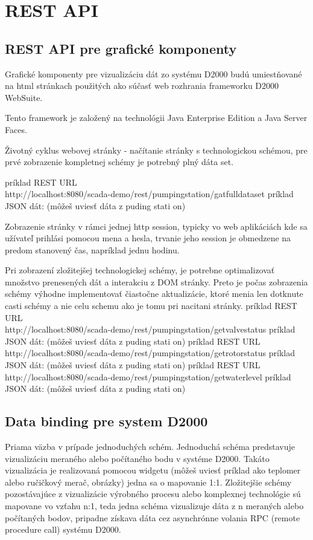 \chapter{REST API}

\section{REST API pre grafické komponenty}
Grafické komponenty pre vizualizáciu dát zo systému D2000 budú umiestňované na html stránkach použitých ako súčasť web rozhrania frameworku D2000 WebSuite.

Tento framework je založený na technológii Java Enterprise Edition a Java Server Faces.

Životný cyklus webovej stránky - načítanie stránky s technologickou schémou, pre prvé zobrazenie kompletnej schémy je potrebný plný dáta set.


príklad REST URL\\ http://localhost:8080/scada-demo/rest/pumpingstation/gatfulldataset
príklad JSON dát: (môžeš uviesť dáta z puding stati on)


Zobrazenie stránky v rámci jednej http session, typicky vo web aplikáciách kde sa užívateľ prihlási pomocou mena a hesla, trvanie jeho session je obmedzene na predom stanovený čas, napríklad jednu hodinu.


Pri zobrazení zložitejšej technologickej schémy, je potrebne optimalizovať množstvo prenesených dát a interakciu z DOM stránky. Preto je počas zobrazenia schémy výhodne implementovať čiastočne aktualizácie, ktoré menia len dotknute casti schémy a nie celu schemu ako je tomu pri nacitani stránky.  
príklad REST URL\\ http://localhost:8080/scada-demo/rest/pumpingstation/getvalvestatus
príklad JSON dát: (môžeš uviesť dáta z puding stati on)
príklad REST URL\\ http://localhost:8080/scada-demo/rest/pumpingstation/getrotorstatus
príklad JSON dát: (môžeš uviesť dáta z puding stati on)
príklad REST URL\\ http://localhost:8080/scada-demo/rest/pumpingstation/getwaterlevel
príklad JSON dát: (môžeš uviesť dáta z puding stati on)


\section{Data binding pre system D2000}
Priama väzba v prípade jednoduchých schém. Jednoduchá schéma predstavuje vizualizáciu meraného alebo počítaného bodu v systéme D2000. Takáto vizualizácia je realizovaná pomocou widgetu (môžeš uviesť príklad ako teplomer alebo ručičkový merač, obrázky) jedna sa o mapovanie 1:1.
Zložitejšie schémy pozostávajúce z vizualizácie výrobného procesu alebo komplexnej technológie sú mapovane vo vzťahu n:1, teda jedna schéma vizualizuje dáta z n meraných alebo počítaných bodov, pripadne získava dáta cez asynchrónne volania RPC (remote procedure call) systému D2000.

